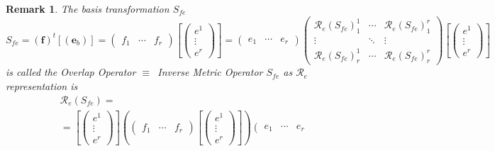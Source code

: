 \documentclass[aps,preprint]{revtex4}
\newtheorem{remark}[theorem]{Remark}
\begin{document}
\begin{remark}
The basis transformation $S_{fe}$ 
\begin{equation}
S_{fe}=\left( \boldsymbol{f}\right) ^{t}\left[ \left( \boldsymbol{e}%
_{b}\right) \right] =\left( 
\begin{array}{ccc}
f_{1} & \cdots & f_{r}%
\end{array}%
\right) \left[ \left( 
\begin{array}{c}
e^{1} \\ 
\vdots \\ 
e^{r}%
\end{array}%
\right) \right] =\left( 
\begin{array}{ccc}
e_{1} & \cdots & e_{r}%
\end{array}%
\right) \left( 
\begin{array}{ccc}
\mathcal{R}_{e}\left( S_{fe}\right) _{1}^{1} & \cdots & \mathcal{R}%
_{e}\left( S_{fe}\right) _{1}^{r} \\ 
\vdots & \ddots & \vdots \\ 
\mathcal{R}_{e}\left( S_{fe}\right) _{r}^{1} & \cdots & \mathcal{R}%
_{e}\left( S_{fe}\right) _{r}^{r}%
\end{array}%
\right) \left[ \left( 
\begin{array}{c}
e^{1} \\ 
\vdots \\ 
e^{r}%
\end{array}%
\right) \right]
\end{equation}%
is called the \emph{Overlap Operator }$\equiv $\emph{\ Inverse Metric
Operator} $S_{fe}$ as $\mathcal{R}_{e}$ representation is 
\begin{gather}
\mathcal{R}_{e}\left( S_{fe}\right) = \\
=\left[ \left( 
\begin{array}{c}
e^{1} \\ 
\vdots \\ 
e^{r}%
\end{array}%
\right) \right] \left( \left( 
\begin{array}{ccc}
f_{1} & \cdots & f_{r}%
\end{array}%
\right) \left[ \left( 
\begin{array}{c}
e^{1} \\ 
\vdots \\ 
e^{r}%
\end{array}%
\right) \right] \right) \left( 
\begin{array}{ccc}
e_{1} & \cdots & e_{r}%
\end{array}%

\end{gather}
\end{remark}
\end{document}
